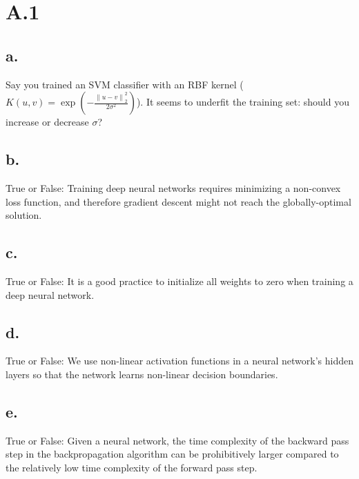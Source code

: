 \documentclass{article}
\date{{}}
\newcommand{\1}{\mathbf{1}}
\newcommand{\norm}[1]{\left\|#1\right\|}
\begin{document}
\thispagestyle{firstpageheader}

\section*{A.1}
{\Large 


\subsection*{a.}

Say you trained an SVM classifier with an RBF kernel ($K(u, v) = \exp\left(-\frac{\norm{u-v}^2_2}{2\sigma^2}\right)$). It seems to underfit the training set: should you increase or decrease $\sigma$?

\subsection*{b.}

True or False:   Training deep neural networks requires minimizing a non-convex loss function, and therefore gradient descent might not reach the globally-optimal solution.

\subsection*{c.}

True or False: It is a good practice to initialize all weights to zero when training a deep neural network.

\subsection*{d.}

True or False:   We use non-linear activation functions in a neural network’s hidden layers so that the network learns non-linear decision boundaries.

\subsection*{e.}

True or False: Given a neural network, the time complexity of the backward pass step in the backpropagation algorithm can be prohibitively larger compared to the relatively low time complexity of the forward pass step.

}
\end{document}
